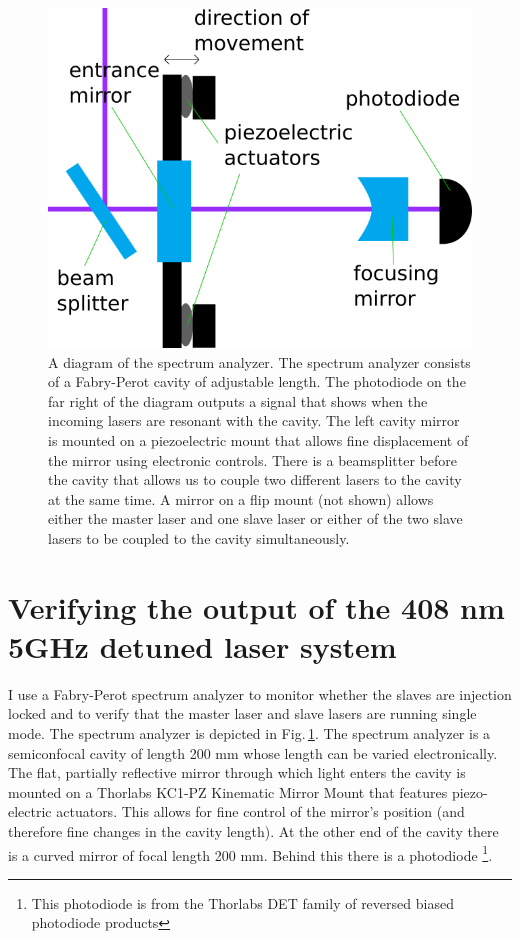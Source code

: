 \begin{figure}
    \centerline{\includegraphics[totalheight=0.3\textheight ]{spectrumAnalyzer}}
    \caption[Spectrum analyzer diagram]{\label{fig:spectrumAnalyzer}
    A diagram of the spectrum analyzer. The spectrum analyzer consists of a Fabry-Perot cavity of adjustable length. The photodiode on the far right of the diagram outputs a signal that shows when the incoming lasers are resonant with the cavity. The left cavity mirror is mounted on a piezoelectric mount that allows fine displacement of the mirror using electronic controls. There is a beamsplitter before the cavity that allows us to couple two different lasers to the cavity at the same time. A mirror on a flip mount (not shown) allows either the master laser and one slave laser or either of the two slave lasers to be coupled to the cavity simultaneously.
}
\end{figure} 

\section{Verifying the output of the 408 nm 5GHz detuned laser system}
\label{spectAnalayzer}
I use a Fabry-Perot spectrum analyzer to monitor whether the slaves are injection locked and to verify that the master laser and slave lasers are running single mode. The spectrum analyzer is depicted in Fig.\,\ref{fig:spectrumAnalyzer}. 
The spectrum analyzer is a semiconfocal cavity of length 200 mm whose length can be varied electronically. The flat, partially reflective mirror through which light enters the cavity is mounted on a Thorlabs KC1-PZ Kinematic Mirror Mount that features piezo-electric actuators. This allows for fine control of the mirror's position (and therefore fine changes in the cavity length). At the other end of the cavity there is a curved mirror of focal length 200 mm. Behind this there is a photodiode \footnote{This photodiode is from the Thorlabs DET family of reversed biased photodiode products}.

